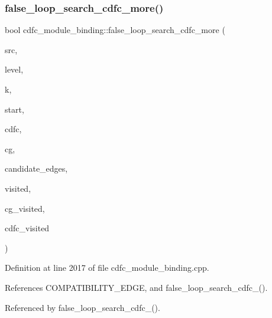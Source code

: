 \subsubsection{\texorpdfstring{false\+\_\+loop\+\_\+search\+\_\+cdfc\+\_\+more()}{false\_loop\_search\_cdfc\_more()}}
{\footnotesize\ttfamily bool cdfc\+\_\+module\+\_\+binding\+::false\+\_\+loop\+\_\+search\+\_\+cdfc\+\_\+more (\begin{DoxyParamCaption}\item[{\hyperlink{cdfc__module__binding_8hpp_affa85aa857f7ad00e0ed52c20fcd863b}{cdfc\+\_\+vertex}}]{src,  }\item[{unsigned int}]{level,  }\item[{unsigned}]{k,  }\item[{\hyperlink{cdfc__module__binding_8hpp_affa85aa857f7ad00e0ed52c20fcd863b}{cdfc\+\_\+vertex}}]{start,  }\item[{const \hyperlink{cdfc__module__binding_8hpp_a3f94e2158e9a11882a35140b0365f1ad}{cdfc\+\_\+graph\+Const\+Ref} \&}]{cdfc,  }\item[{const \hyperlink{cdfc__module__binding_8hpp_a3f94e2158e9a11882a35140b0365f1ad}{cdfc\+\_\+graph\+Const\+Ref} \&}]{cg,  }\item[{std\+::deque$<$ \hyperlink{cdfc__module__binding_8hpp_a5ef126c5daeb3e4b387d23088ebce43e}{cdfc\+\_\+edge} $>$ \&}]{candidate\+\_\+edges,  }\item[{std\+::vector$<$ bool $>$ \&}]{visited,  }\item[{std\+::vector$<$ bool $>$ \&}]{cg\+\_\+visited,  }\item[{std\+::vector$<$ bool $>$ \&}]{cdfc\+\_\+visited }\end{DoxyParamCaption})\hspace{0.3cm}{\ttfamily [protected]}}



Definition at line 2017 of file cdfc\+\_\+module\+\_\+binding.\+cpp.



References C\+O\+M\+P\+A\+T\+I\+B\+I\+L\+I\+T\+Y\+\_\+\+E\+D\+GE, and false\+\_\+loop\+\_\+search\+\_\+cdfc\+\_().



Referenced by false\+\_\+loop\+\_\+search\+\_\+cdfc\+\_().

